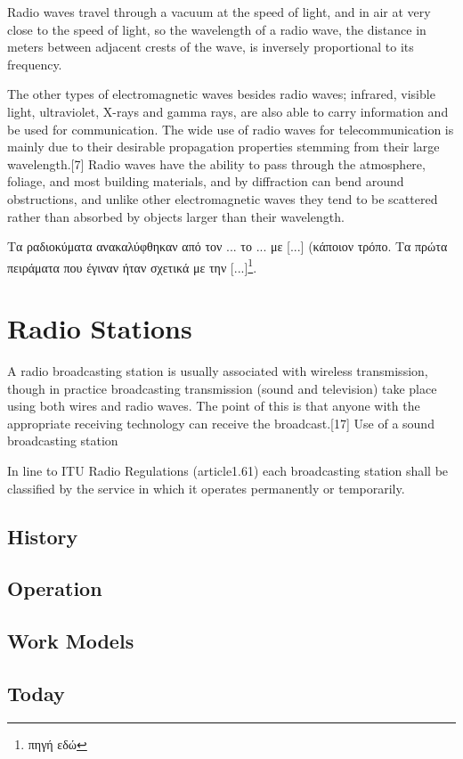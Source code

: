 \documentclass[12pt]{report}
\begin{document}
Radio waves travel through a vacuum at the speed of light, and in air at very close to the speed of light, so the wavelength of a radio wave, the distance in meters between adjacent crests of the wave, is inversely proportional to its frequency.

The other types of electromagnetic waves besides radio waves; infrared, visible light, ultraviolet, X-rays and gamma rays, are also able to carry information and be used for communication. The wide use of radio waves for telecommunication is mainly due to their desirable propagation properties stemming from their large wavelength.[7] Radio waves have the ability to pass through the atmosphere, foliage, and most building materials, and by diffraction can bend around obstructions, and unlike other electromagnetic waves they tend to be scattered rather than absorbed by objects larger than their wavelength.


Τα ραδιοκύματα ανακαλύφθηκαν από τον ... το ... με [...] (κάποιον τρόπο. Τα πρώτα πειράματα που έγιναν ήταν σχετικά με την [...]\footnote{πηγή εδώ}.
\section{Radio Stations}
A radio broadcasting station is usually associated with wireless transmission, though in practice broadcasting transmission (sound and television) take place using both wires and radio waves. The point of this is that anyone with the appropriate receiving technology can receive the broadcast.[17]
Use of a sound broadcasting station

In line to ITU Radio Regulations (article1.61) each broadcasting station shall be classified by the service in which it operates permanently or temporarily.

\subsection{History}

\subsection{Operation}
\subsection{Work Models}
\subsection{Today}
\end{document}
